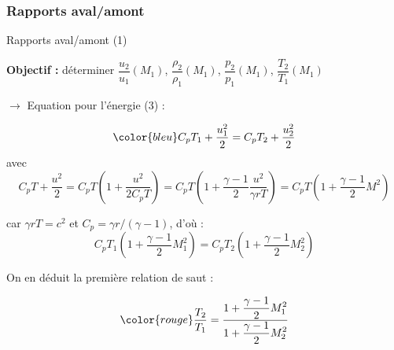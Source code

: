 \subsubsection{Rapports aval/amont}
\begin{frame}{Rapports aval/amont (1)}

\small

\textbf{Objectif :} 
déterminer $\dfrac{u_2}{u_1}(M_1)$, $\dfrac{\rho_2}{\rho_1}(M_1)$, 
$\dfrac{p_2}{p_1}(M_1)$, $\dfrac{T_2}{T_1}(M_1)$

\bigskip

\pause

$\rightarrow$ Equation pour l'énergie (3) : 

\[ \color{bleu}
	C_p T_1 + \dfrac{u_1^2}{2} = C_p T_2 + \dfrac{u_2^2}{2}
\]
\pause
avec
\[
C_p T + \dfrac{u^2}{2} = C_p T \left ( 1 + \dfrac{u^2}{2C_p T} \right )
= C_p T \left ( 1 + \dfrac{\gamma - 1}{2}\dfrac{u^2}{\gamma r T} \right )
= C_p T \left ( 1 + \dfrac{\gamma - 1}{2} M^2 \right )
\]

car $\gamma r T = c^2$ et $C_p = \gamma r / (\gamma-1)$\pause, 
d'où :
\[
	C_p T_1 \left ( 1 + \dfrac{\gamma - 1}{2} M_1^2 \right ) = C_p T_2 \left ( 1 + \dfrac{\gamma - 1}{2} M_2^2 \right )
\]

\pause
\medskip
On en déduit la première relation de saut :

\begin{equation}
	\color{rouge}
	\frac{T_2}{T_1} = \frac{1 + \dfrac{\gamma - 1}{2} M_1^2}{1 + \dfrac{\gamma - 1}{2} M_2^2}
\end{equation}


\vspace{5mm}

\end{frame}

